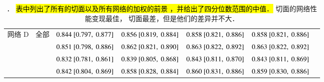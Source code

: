 \begin{sidewaystable*}
\begin{center}
\begin{tabular}{ccccccc}
\midrule
网络 D & 全部    & $0.844~[0.797,~0.877]$ & $0.856~[0.819,~0.884]$ & $0.858~[0.821,~0.886]$ & $0.858~[0.821,~0.886]$ \\
          & \SA{}  & $0.851~[0.798,~0.886]$ & $0.862~[0.821,~0.890]$ & $0.863~[0.822,~0.892]$ & $0.863~[0.822,~0.892]$ \\
          & \HLA{} & $0.832~[0.781,~0.861]$ & $0.839~[0.805,~0.868]$ & $0.843~[0.811,~0.870]$ & $0.843~[0.811,~0.869]$ \\
          & \VLA{} & $0.842~[0.804,~0.869]$ & $0.858~[0.828,~0.884]$ & $0.860~[0.831,~0.886]$ & $0.859~[0.830,~0.886]$ \\
\bottomrule
\end{tabular}
\caption[\captiontitle{}]{\captiontitle{}．
\hl{
表中列出了所有的切面以及所有网络的加权的前景 \IoU{}，并给出了四分位数范围的中值．
}
\SA{} 切面的网络性能变现最佳，\HLA{} 切面最差，但是他们的差异并不大．
}
\label{tab:architectureaccuracy}
\end{center}
\end{sidewaystable*}
